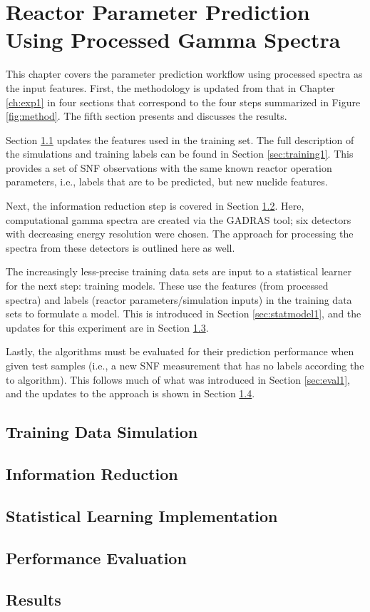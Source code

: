 
\glsresetall

\chapter{Reactor Parameter Prediction Using Processed Gamma Spectra}
\label{ch:exp2}

This chapter covers the parameter prediction workflow using processed spectra
as the input features. First, the methodology is updated from that in Chapter
\ref{ch:exp1} in four sections that correspond to the four steps summarized in
Figure \ref{fig:method}.  The fifth section presents and discusses the results.

Section \ref{sec:training2} updates the features used in the training set. The
full description of the simulations and training labels can be found in Section
\ref{sec:training1}.  This provides a set of \gls{SNF} observations with the
same known reactor operation parameters, i.e., labels that are to be predicted,
but new nuclide features.

Next, the information reduction step is covered in Section
\ref{sec:inforeduc2}.  Here, computational gamma spectra are created via the
\gls{GADRAS} tool; six detectors with decreasing energy resolution were chosen.
The approach for processing the spectra from these detectors is outlined here
as well. 

The increasingly less-precise training data sets are input to a statistical
learner for the next step: training models.  These use the features (from
processed spectra) and labels (reactor parameters/simulation inputs) in the
training data sets to formulate a model.  This is introduced in Section
\ref{sec:statmodel1}, and the updates for this experiment are in Section
\ref{sec:statmodel2}. 

Lastly, the algorithms must be evaluated for their prediction performance when
given test samples (i.e., a new \gls{SNF} measurement that has no labels
according the to algorithm).  This follows much of what was introduced in
Section \ref{sec:eval1}, and the updates to the approach is shown in Section
\ref{sec:eval2}. 

\section{Training Data Simulation}
\label{sec:training2}


\section{Information Reduction}
\label{sec:inforeduc2}


\section{Statistical Learning Implementation}
\label{sec:statmodel2}


\section{Performance Evaluation}
\label{sec:eval2}


\section{Results}
\label{sec:results2}

